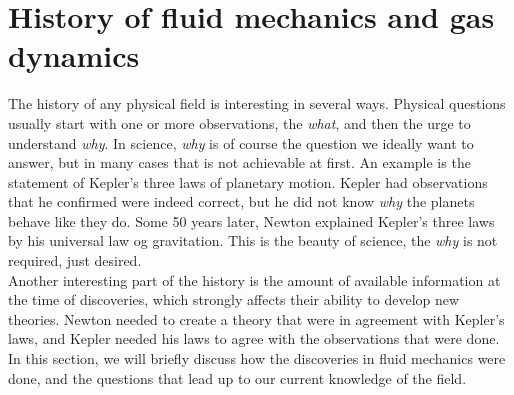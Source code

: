 \section{History of fluid mechanics and gas dynamics}
The history of any physical field is interesting in several ways. Physical questions usually start with one or more observations, the \textit{what}, and then the urge to understand \textit{why}. In science, \textit{why} is of course the question we ideally want to answer, but in many cases that is not achievable at first. An example is the statement of Kepler's three laws of planetary motion. Kepler had observations that he confirmed were indeed correct, but he did not know \textit{why} the planets behave like they do. Some 50 years later, Newton explained Kepler's three laws by his universal law og gravitation. This is the beauty of science, the \textit{why} is not required, just desired.\\
Another interesting part of the history is the amount of available information at the time of discoveries, which strongly affects their ability to develop new theories. Newton needed to create a theory that were in agreement with Kepler's laws, and Kepler needed his laws to agree with the observations that were done.\\
In this section, we will briefly discuss how the discoveries in fluid mechanics were done, and the questions that lead up to our current knowledge of the field. 


